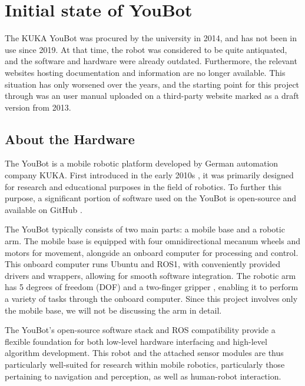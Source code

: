 \documentclass[a4paper, 12pt]{article}
\newif\ifshownotes
\newcommand{\notes}[1]{\ifshownotes\textcolor{blue}{#1}\fi}
\begin{document}


        

    \pagebreak

    \section{Initial state of YouBot}

    The KUKA YouBot was procured by the university in 2014, and has not been in use since 2019. At that time, the robot was considered to be quite antiquated, and the software and hardware were already outdated. Furthermore, the relevant websites hosting documentation and information are no longer available. This situation has only worsened over the years, and the starting point for this project through was an user manual uploaded on a third-party website marked as a draft version from 2013. 

    \subsection{About the Hardware}

    The YouBot is a mobile robotic platform developed by German automation company KUKA. First introduced in the early 2010s \notes{[cite]}, it was primarily designed for research and educational purposes in the field of robotics. To further this purpose, a significant portion of software used on the YouBot is open-source and available on GitHub \notes{[cite]}.

    The YouBot typically consists of two main parts: a mobile base and a robotic arm. The mobile base is equipped with four omnidirectional mecanum wheels and motors for movement, alongside an onboard computer for processing and control. This onboard computer runs Ubuntu and ROS1, with conveniently provided drivers and wrappers, allowing for smooth software integration. The robotic arm has 5 degrees of freedom (DOF) and a two-finger gripper \notes{[cite]}, enabling it to perform a variety of tasks through the onboard computer. Since this project involves only the mobile base, we will not be discussing the arm in detail.

    The YouBot's open-source software stack and ROS compatibility provide a flexible foundation for both low-level hardware interfacing and high-level algorithm development. This robot and the attached sensor modules are thus particularly well-suited for research within mobile robotics, particularly those pertaining to navigation and perception, as well as human-robot interaction. 
\end{document}
